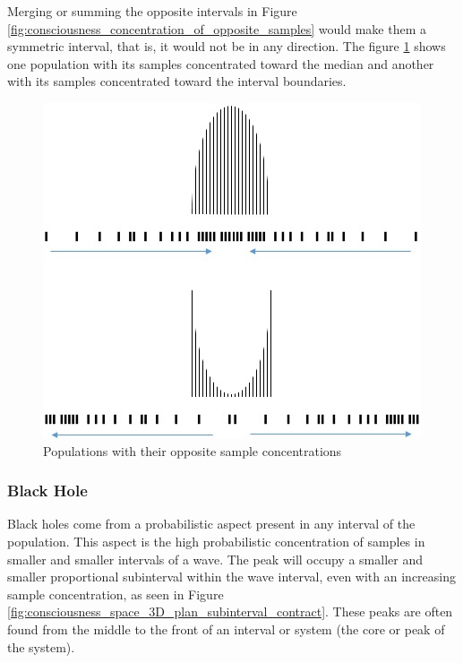 Merging or summing the opposite intervals in Figure \ref{fig:consciousness_concentration_of_opposite_samples} would make them a symmetric interval, that is, it would not be in any direction.
The figure \ref{fig:consciousness_concentration_of_opposite_samples_within_range} shows one population with its samples concentrated toward the median and another with its samples concentrated toward the interval boundaries.
	\begin{figure}[H]
	\caption{Populations with their opposite sample concentrations}
	\label{fig:consciousness_concentration_of_opposite_samples_within_range}
	\centering
	\includegraphics[scale=.7]{sections/images/consciousness_concentration_of_opposite_samples_within_range.jpg}
	\end{figure}

\subsubsection{Black Hole}
Black holes come from a probabilistic aspect present in any interval of the population. This aspect is the high probabilistic concentration of samples in smaller and smaller intervals of a wave. The peak will occupy a smaller and smaller proportional subinterval within the wave interval, even with an increasing sample concentration, as seen in Figure \ref{fig:consciousness_space_3D_plan_subinterval_contract}. These peaks are often found from the middle to the front of an interval or system (the core or peak of the system).

